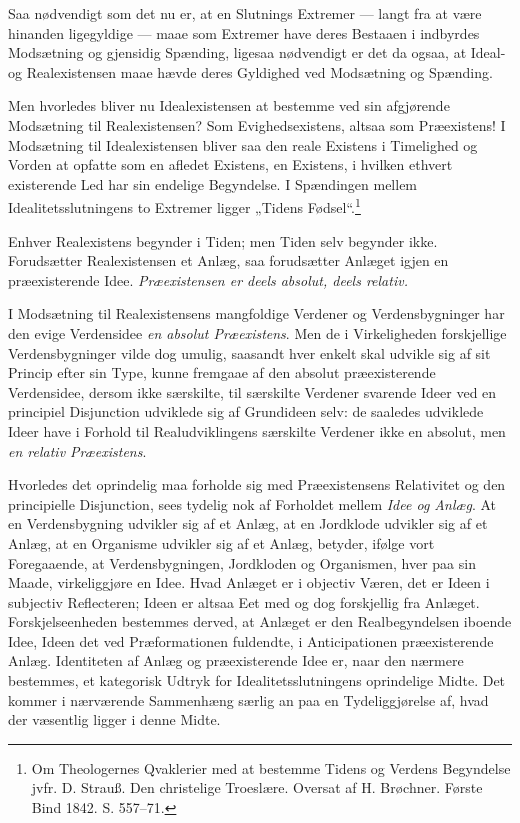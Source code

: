 \documentclass[12pt]{book}
\newcommand{\opage}[1]{\marginnote{\footnotesize\textit{[#1]}}}
\begin{document}
Saa nødvendigt som det nu er, at en Slutnings Extremer --- langt fra at være hinanden ligegyldige --- maae som Extremer have deres Bestaaen i indbyrdes Modsætning og gjensidig Spænding, ligesaa nødvendigt er det da ogsaa, at Ideal- og Realexistensen maae hævde deres Gyldighed ved Modsætning og Spænding.

Men hvorledes bliver nu Idealexistensen at bestemme ved sin afgjørende Modsætning til Realexistensen? Som Evighedsexistens, altsaa som Præexistens! I Modsætning til Idealexistensen bliver saa den reale Existens i Timelighed og Vorden at opfatte som en afledet Existens, en Existens, i hvilken ethvert existerende Led har sin endelige Begyndelse. I Spændingen mellem Idealitetsslutningens to Extremer ligger „Tidens Fødsel“.\footnote{Om Theologernes Qvaklerier med at bestemme Tidens og Verdens Begyndelse jvfr. D. Strauß. Den christelige Troeslære. Oversat af H. Brøchner. Første Bind 1842. S. 557--71.}%

\opage{440}Enhver Realexistens begynder i Tiden; men Tiden selv begynder ikke. Forudsætter Realexistensen et Anlæg, saa forudsætter Anlæget igjen en præexisterende Idee. \emph{Præexistensen er deels absolut, deels relativ.}

I Modsætning til Realexistensens mangfoldige Verdener og Verdensbygninger har den evige Verdensidee \emph{en absolut Præexistens}. Men de i Virkeligheden forskjellige Verdensbygninger vilde dog umulig, saasandt hver enkelt skal udvikle sig af sit Princip efter sin Type, kunne fremgaae af den absolut præexisterende Verdensidee, dersom ikke særskilte, til særskilte Verdener svarende Ideer ved en principiel Disjunction udviklede sig af Grundideen selv: de saaledes udviklede Ideer have i Forhold til Realudviklingens særskilte Verdener ikke en absolut, men \emph{en relativ Præexistens}.

Hvorledes det oprindelig maa forholde sig med Præexistensens Relativitet og den principielle Disjunction, sees tydelig nok af Forholdet mellem \emph{Idee og Anlæg}. At en Verdensbygning udvikler sig af et Anlæg, at en Jordklode udvikler sig af et Anlæg, at en Organisme udvikler sig af et Anlæg, betyder, ifølge vort Foregaaende, at Verdensbygningen, Jordkloden og Organismen, hver paa sin Maade, virkeliggjøre en Idee. Hvad Anlæget er i objectiv Væren, det er Ideen i subjectiv Reflecteren; Ideen er altsaa Eet med og dog forskjellig fra Anlæget. Forskjelseenheden bestemmes derved, at Anlæget er den Realbegyndelsen iboende Idee, Ideen det ved Præformationen fuldendte, i Anticipationen præexisterende Anlæg. Identiteten af Anlæg og præexisterende Idee er, naar den nærmere bestemmes, et kategorisk Udtryk for Idealitetsslutningens oprindelige Midte. Det kommer i nærværende Sammenhæng særlig an paa en Tydeliggjørelse af, hvad der væsentlig ligger i denne Midte.
\end{document}
